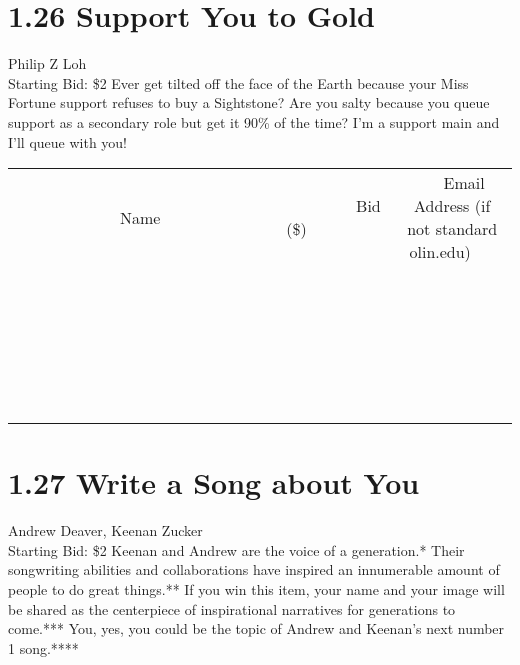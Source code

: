 \documentclass[11pt]{article}
\begin{document}
\section*{1.26 Support You to Gold}
Philip Z Loh
\\
Starting Bid: \$2
\newline
Ever get tilted off the face of the Earth because your Miss Fortune support refuses to buy a Sightstone? Are you salty because you queue support as a secondary role but get it 90\% of the time? I'm a support main and I'll queue with you!
\\[6ex]
\begin{tabular}{c c c}
~~~~~~~~~~~~~Name~~~~~~~~~~~~~ & ~~~~~~~~~Bid (\$)~~~~~~~~~  & ~~~Email Address (if not standard olin.edu)~~~\\
 & & \\
\hline
 & & \\
\hline
 & & \\
\hline
 & & \\
\hline
 & & \\
\hline
 & & \\
\hline
 & & \\
\hline
 & & \\
\hline
 & & \\
\hline
 & & \\
\hline
 & & \\
\hline
 & & \\
\hline
 & & \\
\hline
 & & \\
\hline
 & & \\
\hline
 & & \\
\hline
 & & \\
\hline
 & & \\
\hline
 & & \\
\hline
 & & \\
\hline
 & & \\
\hline
 & & \\
\hline
 & & \\
\hline
 & & \\
\hline
 & & \\
\hline
 & & \\
\hline
\end{tabular}
\newpage
\section*{1.27 Write a Song about You}
Andrew Deaver, Keenan Zucker
\\
Starting Bid: \$2
\newline
Keenan and Andrew are the voice of a generation.* Their songwriting abilities and collaborations have inspired an innumerable amount of people to do great things.** If you win this item, your name and your image will be shared as the centerpiece of inspirational narratives for generations to come.*** You, yes, you could be the topic of Andrew and Keenan's next number 1 song.****
\end{document}
